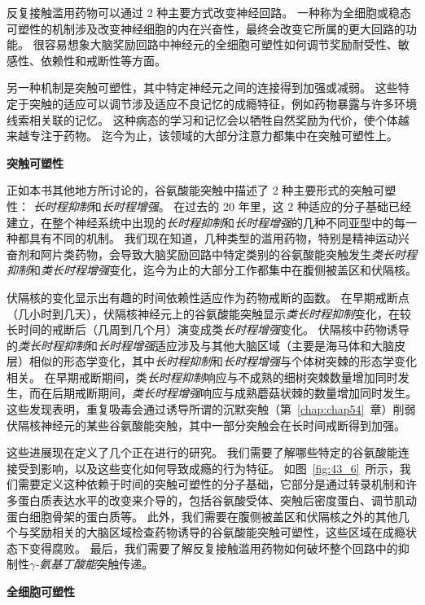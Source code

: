 反复接触滥用药物可以通过 2 种主要方式改变神经回路。
一种称为全细胞或稳态可塑性的机制涉及改变神经细胞的内在兴奋性，最终会改变它所属的更大回路的功能。
很容易想象大脑奖励回路中神经元的全细胞可塑性如何调节奖励耐受性、敏感性、依赖性和戒断性等方面。


另一种机制是突触可塑性，其中特定神经元之间的连接得到加强或减弱。
这些特定于突触的适应可以调节涉及适应不良记忆的成瘾特征，例如药物暴露与许多环境线索相关联的记忆。
这种病态的学习和记忆会以牺牲自然奖励为代价，使个体越来越专注于药物。
迄今为止，该领域的大部分注意力都集中在突触可塑性上。


\textbf{突触可塑性}

正如本书其他地方所讨论的，谷氨酸能突触中描述了 2 种主要形式的突触可塑性：
\textit{长时程抑制}和\textit{长时程增强}。
在过去的 20 年里，这 2 种适应的分子基础已经建立，在整个神经系统中出现的\textit{长时程抑制}和\textit{长时程增强}的几种不同亚型中的每一种都具有不同的机制。
我们现在知道，几种类型的滥用药物，特别是精神运动兴奋剂和阿片类药物，会导致大脑奖励回路中特定类别的谷氨酸能突触发生\textit{类长时程抑制}和\textit{类长时程增强}变化，迄今为止的大部分工作都集中在腹侧被盖区和伏隔核。


伏隔核的变化显示出有趣的时间依赖性适应作为药物戒断的函数。
在早期戒断点（几小时到几天），伏隔核神经元上的谷氨酸能突触显示\textit{类长时程抑制}变化，在较长时间的戒断后（几周到几个月）演变成类\textit{长时程增强}变化。
伏隔核中药物诱导的\textit{类长时程抑制}和\textit{长时程增强}适应涉及与其他大脑区域（主要是海马体和大脑皮层）相似的形态学变化，其中\textit{长时程抑制}和\textit{长时程增强}与个体树突棘的形态学变化相关。
在早期戒断期间，类\textit{长时程抑制}响应与不成熟的细树突棘数量增加同时发生，而在后期戒断期间，\textit{类长时程增强}响应与成熟蘑菇状棘的数量增加同时发生。
这些发现表明，重复吸毒会通过诱导所谓的沉默突触（第~\ref{chap:chap54}~章）削弱伏隔核神经元的某些谷氨酸能突触，其中一部分突触会在长时间戒断得到加强。


这些进展现在定义了几个正在进行的研究。
我们需要了解哪些特定的谷氨酸能连接受到影响，以及这些变化如何导致成瘾的行为特征。
如图~\ref{fig:43_6}~所示，我们需要定义这种依赖于时间的突触可塑性的分子基础，它部分是通过转录机制和许多蛋白质表达水平的改变来介导的，包括谷氨酸受体、突触后密度蛋白、调节肌动蛋白细胞骨架的蛋白质等。
此外，我们需要在腹侧被盖区和伏隔核之外的其他几个与奖励相关的大脑区域检查药物诱导的谷氨酸能突触可塑性，这些区域在成瘾状态下变得腐败。
最后，我们需要了解反复接触滥用药物如何破坏整个回路中的抑制性\textit{$\gamma$-氨基丁酸能}突触传递。


\textbf{全细胞可塑性}

